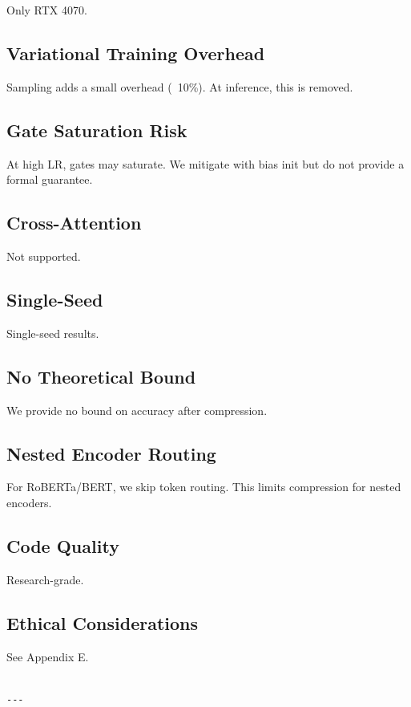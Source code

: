 Only RTX 4070.

\subsection{Variational Training Overhead}

Sampling adds a small overhead (~10\%). At inference, this is removed.

\subsection{Gate Saturation Risk}

At high LR, gates may saturate. We mitigate with bias init but do not 
provide a formal guarantee.

\subsection{Cross-Attention}

Not supported.

\subsection{Single-Seed}

Single-seed results.

\subsection{No Theoretical Bound}

We provide no bound on accuracy after compression.

\subsection{Nested Encoder Routing}

For RoBERTa/BERT, we skip token routing. This limits compression for 
nested encoders.

\subsection{Code Quality}

Research-grade.

\subsection{Ethical Considerations}

See Appendix E.
\begin{lstlisting}

---
\end{lstlisting}